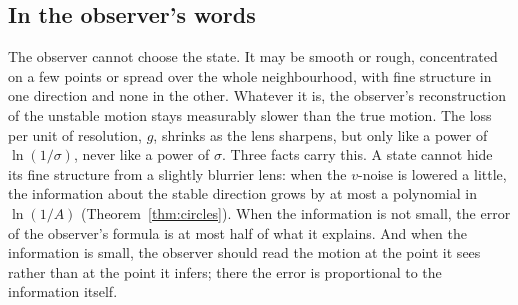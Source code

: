 \subsection{In the observer's words}
The observer cannot choose the state.
It may be smooth or rough, concentrated on a few points or spread over the whole neighbourhood, with fine structure in one direction and none in the other.
Whatever it is, the observer's reconstruction of the unstable motion stays measurably slower than the true motion.
The loss per unit of resolution, $g$, shrinks as the lens sharpens, but only like a power of $\ln(1/\sigma)$, never like a power of $\sigma$.
Three facts carry this.
A state cannot hide its fine structure from a slightly blurrier lens: when the $v$-noise is lowered a little, the information about the stable direction grows by at most a polynomial in $\ln(1/A)$ (Theorem~\ref{thm:circles}).
When the information is not small, the error of the observer's formula is at most half of what it explains.
And when the information is small, the observer should read the motion at the point it sees rather than at the point it infers; there the error is proportional to the information itself.
